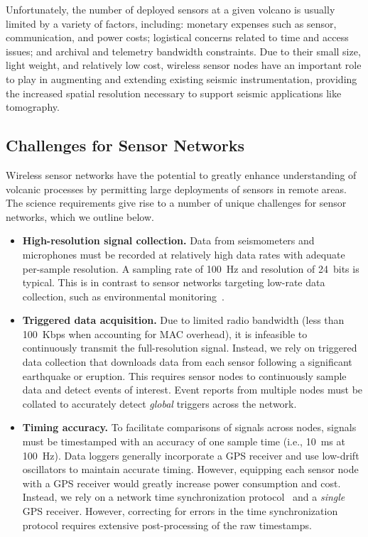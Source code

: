 Unfortunately, the number of deployed sensors at a given volcano is usually
limited by a variety of factors, including: monetary expenses such as sensor,
communication, and power costs; logistical concerns related to time and
access issues; and archival and telemetry bandwidth constraints. Due to their
small size, light weight, and relatively low cost, wireless sensor nodes have
an important role to play in augmenting and extending existing seismic
instrumentation, providing the increased spatial resolution necessary to
support seismic applications like tomography.

\subsection{Challenges for Sensor Networks}

Wireless sensor networks have the potential to greatly enhance understanding
of volcanic processes by permitting large deployments of sensors in remote
areas. The science requirements give rise to a number of unique challenges
for sensor networks, which we outline below.

\begin{itemize}

\item \textbf{High-resolution signal collection.} Data from seismometers and
microphones must be recorded at relatively high data rates with adequate
per-sample resolution. A sampling rate of 100~Hz and resolution of 24~bits is
typical. This is in contrast to sensor networks targeting low-rate data
collection, such as environmental
monitoring~\cite{gdi-sensys04,berkeley-redwoods}.

\item \textbf{Triggered data acquisition.} Due to limited radio bandwidth
(less than 100~Kbps when accounting for MAC overhead), it is infeasible to
continuously transmit the full-resolution signal. Instead, we rely on
triggered data collection that downloads data from each sensor following a
significant earthquake or eruption. This requires sensor nodes to
continuously sample data and detect events of interest. Event reports from
multiple nodes must be collated to accurately detect \textit{global} triggers
across the network.

\item \textbf{Timing accuracy.} To facilitate comparisons of signals across
nodes, signals must be timestamped with an accuracy of one sample time (i.e.,
10~ms at 100~Hz). Data loggers generally incorporate a GPS receiver and use
low-drift oscillators to maintain accurate timing. However, equipping each
sensor node with a GPS receiver would greatly increase power consumption and
cost. Instead, we rely on a network time synchronization
protocol~\cite{rbs,ftsp} and a \textit{single} GPS receiver. However,
correcting for errors in the time synchronization protocol requires extensive
post-processing of the raw timestamps.

\end{itemize}
